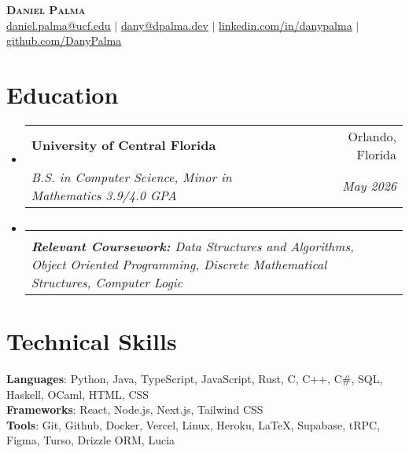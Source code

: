 \documentclass[letterpaper,11pt]{article}
\makeatletter
\newcommand{\resumeSubheading}[4]{
  \vspace{-2pt}\item
    \begin{tabular*}{0.97\textwidth}[t]{l@{\extracolsep{\fill}}r}
      \textbf{#1} & #2 \\
      \textit{\small#3} & \textit{\small #4} \\
    \end{tabular*}\vspace{-7pt}
}
\newcommand{\resumeSubHeadingListStart}{\begin{itemize}[leftmargin=0.15in, label={}]}
\newcommand{\resumeSubHeadingListEnd}{\end{itemize}}
\makeatother
\begin{document}

\begin{center}
    \textbf{\Huge \scshape Daniel Palma} \\ \vspace{1pt}
    \href{mailto:daniel.palma@ucf.edu}{\underline{daniel.palma@ucf.edu}} $|$ \href{mailto:dany@dpalma.dev}{\underline{dany@dpalma.dev}} $|$ 
    \href{https://linkedin.com/in/danypalma}{\underline{linkedin.com/in/danypalma}} $|$
    \href{https://github.com/DanyPalma}{\underline{github.com/DanyPalma}}
\end{center}


\section{Education}
  \resumeSubHeadingListStart
    \resumeSubheading
      {University of Central Florida}{Orlando, Florida}
      {B.S. in Computer Science, Minor in Mathematics 3.9/4.0 GPA}{May 2026}
    
      \vspace{-15pt}
    \resumeSubheading
      {}{}
      {\scriptsize{\textbf{Relevant Coursework: }Data Structures and Algorithms, Object Oriented Programming, Discrete Mathematical Structures, Computer Logic}}{}
  \resumeSubHeadingListEnd

\section{Technical Skills}
\begin{itemize}[leftmargin=0.15in, label={}]
   \small{\item{
    \textbf{Languages}{: Python, Java, TypeScript, JavaScript, Rust, C, C++, C\#, SQL, Haskell, OCaml,  HTML, CSS} \\
    \textbf{Frameworks}{: React, Node.js, Next.js, Tailwind CSS} \\
    \textbf{Tools}{: Git, Github, Docker, Vercel, Linux, Heroku, LaTeX, Supabase, tRPC, Figma, Turso, Drizzle ORM, Lucia} \\
   }}
\end{itemize}
\end{document}
